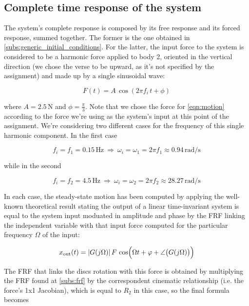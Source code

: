 \documentclass[a4paper,12pt,oneside]{article}
\begin{document}
\vspace{30pt}

\subsection{Complete time response of the system}

The system's complete response is composed by its free response and its forced response, summed together. The former is the one obtained in \ref{subs:generic_initial_conditions}. For the latter, the input force to the system is considered to be a harmonic force applied to body 2, oriented in the vertical direction (we chose the verse to be upward, as it's not specified by the assignment) and made up by a single sinusoidal wave:

\[ F(t) = A \, \cos(2 \pi f_i \, t + \phi) \]

where $ A = 2.5 \, \text{N} $ and $ \phi = \frac{\pi}{3} $. Note that we chose the force for \eqref{eqn:motion} according to the force we're using as the system's input at this point of the assignment. We're considering two different cases for the frequency of this single harmonic component. In the first case

\[
	f_i = f_1 = 0.15 \, \text{Hz} ~ \Rightarrow ~
		\omega_i = \omega_1 = 2 \pi f_1 \approx 0.94 \, \text{rad/s}
\]

while in the second

\[
	f_i = f_2 = 4.5 \, \text{Hz} ~ \Rightarrow ~
		\omega_i = \omega_2 = 2 \pi f_2 \approx 28.27 \, \text{rad/s}
\]

In each case, the steady-state motion has been computed by applying the well-known theoretical result stating the output of a linear time-invariant system is equal to the system input moduated in amplitude and phase by the FRF linking the independent variable with that input force computed for the particular frequency $ \Omega $ of the input:

\begin{equation}
\label{eqn:lti_output}
	x_\textup{out}(t) = |G(j \Omega)| \, F \,
		\cos\Bigl(\Omega t + \varphi + \angle\bigl(G(j \Omega)\bigr)\Bigr)
\end{equation}

The FRF that links the discs rotation with this force is obtained by multiplying the FRF found at \ref{subs:frf} by the correspondent cinematic relationship (i.e. the force's 1x1 Jacobian), which is equal to $ R_2 $ in this case, so the final formula becomes
\end{document}
